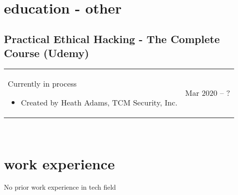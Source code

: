 \documentclass[a4paper]{article}
\makeatletter
\newlength{\tablewidth}
\newenvironment{period}[2]{%
\newcommand{\sarma}{#2}%
\setlength{\tablewidth}{\linewidth}
\addtolength{\tablewidth}{-2\tabcolsep}
\begin{tabular}{@{}p{0.75\tablewidth}>{\raggedleft\arraybackslash}p{0.25\tablewidth}@{}}%
#1 \newline
\begin{itemize}
}{%
\end{itemize} & \sarma \\%
\end{tabular}\\
}
\makeatother
\begin{document}
\section{education - other}

\subsection{Practical Ethical Hacking - The Complete Course (Udemy)}
\begin{period}{Currently in process}{Mar 2020 -- ?}
\item Created by Heath Adams, TCM Security, Inc.
\end{period}

\section{work experience}
No prior work experience in tech field\\
\iffalse

\subsection{Firma d.o.o., Zagreb, Croatia}
\begin{period}{Software Engineering Intern}{Jun 2012 -- Sep 2012}
    \item 
        worked on improving a copyright infringement detection system
        \begin{itemize}
            \item Java, Git, Linux
            \item awarded for having best test code coverage out of all (10) interns
        \end{itemize}
\end{period}
\subsection{University of Zagreb, Faculty of Electrical Engineering and Computing, Croatia}
\begin{period}{Teaching assistant}{Oct 2008 -- May 2009}
    \item Digital Logic
    \item Algorithms and Data Structures
\end{period}
\begin{period}{Team leader}{Sep 2011 -- Jan 2012}
    \item managed a team of 10 students in \textit{Software Design} class project
\end{period}
\fi
\end{document}
